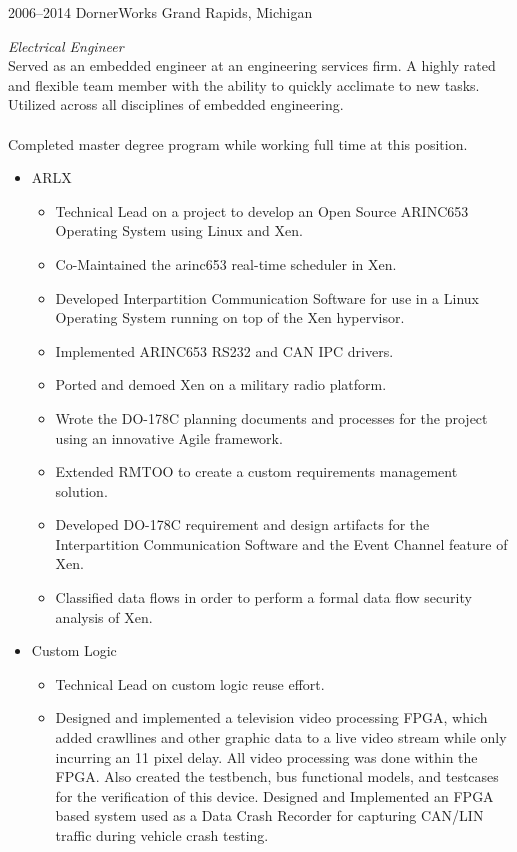 \documentclass[print]{template/friggeri-cv} %
\begin{document}
\begin{entrylist}

\entry
{2006--2014}
{DornerWorks}
{Grand Rapids, Michigan}
{\emph{Electrical Engineer} \\
Served as an embedded engineer at an engineering services firm.  A highly rated and flexible team member with the ability to quickly acclimate to new tasks.  Utilized across all disciplines of embedded engineering.  
\\
\\
Completed master degree program while working full time at this position.
\begin{itemize}
\item ARLX
\begin{itemize}
\item Technical Lead on a project to develop an Open Source ARINC653 Operating System using Linux and Xen.
\item Co-Maintained the arinc653 real-time scheduler in Xen.
\item Developed Interpartition Communication Software for use in a Linux Operating System running on top of the Xen hypervisor.
\item Implemented ARINC653 RS232 and CAN IPC drivers.
\item Ported and demoed Xen on a military radio platform.
\item Wrote the DO-178C planning documents and processes for the project using an innovative Agile framework.
\item Extended RMTOO to create a custom requirements management solution.
\item Developed DO-178C requirement and design artifacts for the Interpartition Communication Software and the Event Channel feature of Xen.
\item Classified data flows in order to perform a formal data flow security analysis of Xen.
\end{itemize}
\item Custom Logic
\begin{itemize}
\item Technical Lead on custom logic reuse effort.
\item Designed and implemented a television video processing FPGA, which added crawllines and other graphic data to a live video stream while only incurring an 11 pixel delay.  All video processing was done within the FPGA.  Also created the testbench, bus functional models, and testcases for the verification of this device.
Designed and Implemented an FPGA based system used as a Data Crash Recorder for capturing CAN/LIN traffic during vehicle crash testing.

\end{itemize}
\end{itemize}}
\end{entrylist}
\end{document}
